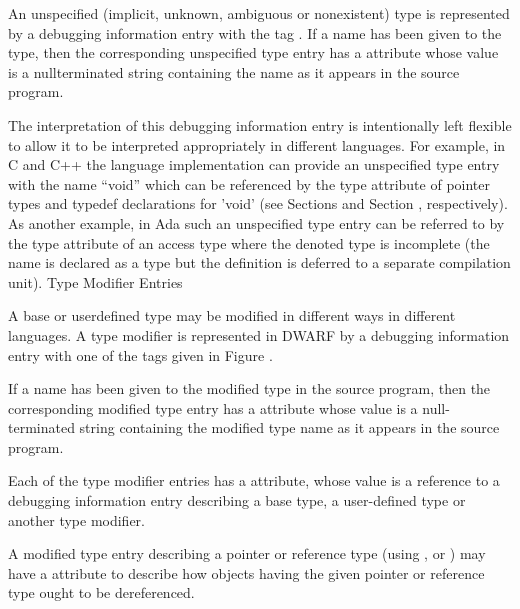 An unspecified (implicit, unknown, ambiguous or nonexistent)
type is represented by a debugging information entry with
the tag . 
If a name has been given
to the type, then the corresponding unspecified type entry
has a  attribute whose value is a null\dash terminated
string containing the name as it appears in the source program.

The interpretation of this debugging information entry is
intentionally left flexible to allow it to be interpreted
appropriately in different languages. For example, in C and C++
the language implementation can provide an unspecified type
entry with the name “void” which can be referenced by the
type attribute of pointer types and typedef declarations for
'void' (see 
Sections  and 
Section , 
respectively). As another
example, in Ada such an unspecified type entry can be referred
to by the type attribute of an access type where the denoted
type is incomplete (the name is declared as a type but the
definition is deferred to a separate compilation unit). Type
Modifier Entries

A base or user\dash defined type may be modified in different ways
in different languages. A type modifier is represented in
DWARF by a debugging information entry with one of the tags
given in 
Figure .


If a name has been given to the modified type in the source
program, then the corresponding modified type entry has
a  attribute whose value is a null-terminated
string containing the modified type name as it appears in
the source program.

Each of the type modifier entries has a  attribute,
whose value is a reference to a debugging information entry
describing a base type, a user-defined type or another type
modifier.

A modified type entry describing a pointer or reference
type (using ,  or
) may have a 
attribute to describe how objects having the given pointer
or reference type ought to be dereferenced.

